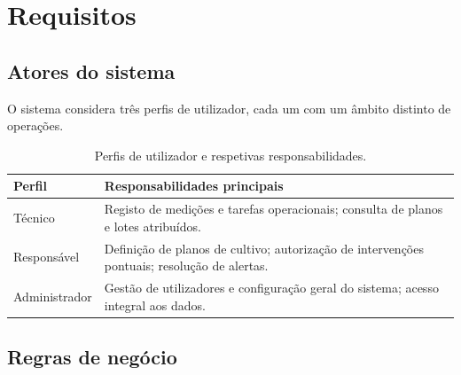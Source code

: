 
\chapter{Requisitos}
\label{cap:requisitos}



\section{Atores do sistema}
\label{sec:atores}


O sistema considera três perfis de utilizador, cada um com um
âmbito distinto de operações.

\begin{table}[H]
\centering
\caption{Perfis de utilizador e respetivas responsabilidades.}
\label{tab:atores}
\renewcommand{\arraystretch}{1.3}
\begin{tabularx}{\linewidth}{l X}
\toprule
\textbf{Perfil} & \textbf{Responsabilidades principais} \\
\midrule
Técnico        & Registo de medições e tarefas operacionais; consulta de planos e lotes atribuídos. \\
Responsável    & Definição de planos de cultivo; autorização de intervenções pontuais; resolução de alertas. \\
Administrador  & Gestão de utilizadores e configuração geral do sistema; acesso integral aos dados. \\
\bottomrule
\end{tabularx}
\end{table}


\section{Regras de negócio}
\label{sec:regras-negocio}

